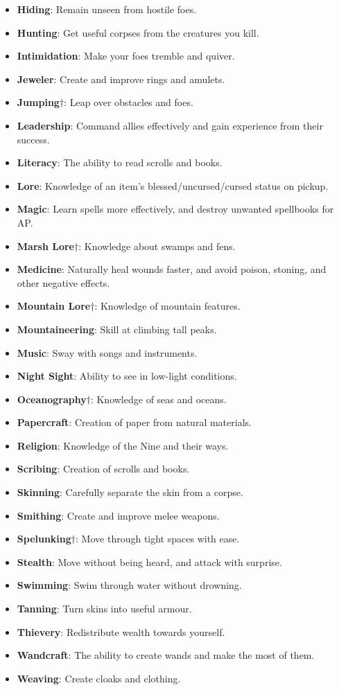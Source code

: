 \begin{itemize}
\item {\bf Hiding}: Remain unseen from hostile foes.
\item {\bf Hunting}: Get useful corpses from the creatures you kill. 
\item {\bf Intimidation}: Make your foes tremble and quiver. 
\item {\bf Jeweler}: Create and improve rings and amulets. 
\item {\bf Jumping}$\dagger$: Leap over obstacles and foes.
\item {\bf Leadership}: Command allies effectively and gain experience from their success. 
\item {\bf Literacy}: The ability to read scrolls and books.
\item {\bf Lore}: Knowledge of an item's blessed/uncursed/cursed status on pickup.
\item {\bf Magic}: Learn spells more effectively, and destroy unwanted spellbooks for AP.
\item {\bf Marsh Lore}$\dagger$: Knowledge about swamps and fens. 
\item {\bf Medicine}: Naturally heal wounds faster, and avoid poison, stoning, and other negative effects.
\item {\bf Mountain Lore}$\dagger$: Knowledge of mountain features. 
\item {\bf Mountaineering}: Skill at climbing tall peaks. 
\item {\bf Music}: Sway with songs and instruments. 
\item {\bf Night Sight}: Ability to see in low-light conditions. 
\item {\bf Oceanography}$\dagger$: Knowledge of seas and oceans. 
\item {\bf Papercraft}: Creation of paper from natural materials. 
\item {\bf Religion}: Knowledge of the Nine and their ways. 
\item {\bf Scribing}: Creation of scrolls and books. 
\item {\bf Skinning}: Carefully separate the skin from a corpse. 
\item {\bf Smithing}: Create and improve melee weapons.
\item {\bf Spelunking}$\dagger$: Move through tight spaces with ease.
\item {\bf Stealth}: Move without being heard, and attack with surprise.
\item {\bf Swimming}: Swim through water without drowning.
\item {\bf Tanning}: Turn skins into useful armour.
\item {\bf Thievery}: Redistribute wealth towards yourself.
\item {\bf Wandcraft}: The ability to create wands and make the most of them.
\item {\bf Weaving}: Create cloaks and clothing.
\end{itemize}

